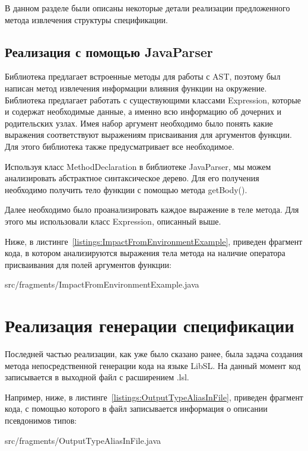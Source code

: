В данном разделе были описаны некоторые детали реализации предложенного метода извлечения структуры спецификации.

\subsection{Реализация с помощью JavaParser}

Библиотека предлагает встроенные методы для работы с AST, поэтому был написан метод извлечения информации влияния функции на окружение.
Библиотека предлагает работать с существующими классами Expression, которые и содержат необходимые данные, а именно всю информацию об дочерних и родительских узлах.
Имея набор аргумент необходимо было понять какие выражения соответствуют выражениям присваивания для аргументов функции.
Для этого библиотека также предусматривает все необходимое.

Используя класс MethodDeclaration в библиотеке JavaParser, мы можем анализировать абстрактное синтаксическое дерево.
Для его получения необходимо получить тело функции с помощью метода getBody().

Далее необходимо было проанализировать каждое выражение в теле метода.
Для этого мы использовали класс Expression, описанный выше.

Ниже, в листинге~\ref{listings:ImpactFromEnvironmentExample}, приведен фрагмент кода, в котором анализируются выражения тела метода на наличие оператора присваивания для полей аргументов функции:

{src/fragments/ImpactFromEnvironmentExample.java}

\section{Реализация генерации спецификации}

Последней частью реализации, как уже было сказано ранее, была задача создания метода непосредственной генерации кода на языке LibSL.
На данный момент код записывается в выходной файл с расширением .lsl.

Например, ниже, в листинге~\ref{listings:OutputTypeAliasInFile}, приведен фрагмент кода, с помощью которого в файл записывается информация о описании псевдонимов типов:

{src/fragments/OutputTypeAliasInFile.java}

